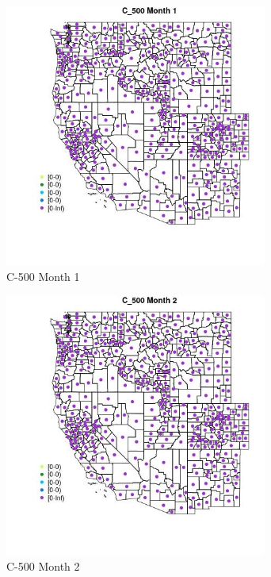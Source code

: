 \begin{figure} 
\centering  
\includegraphics[width=0.77\textwidth]{Code_Outputs/df_report_ML_predictors_CountyCentroid_Locations_Dates_2008-01-01to2018-12-31_MapObsMo1C_500.jpg} 
\caption{\label{fig:df_report_ML_predictors_CountyCentroid_Locations_Dates_2008-01-01to2018-12-31MapObsMo1C_500}C-500 Month 1} 
\end{figure} 
 

\begin{figure} 
\centering  
\includegraphics[width=0.77\textwidth]{Code_Outputs/df_report_ML_predictors_CountyCentroid_Locations_Dates_2008-01-01to2018-12-31_MapObsMo2C_500.jpg} 
\caption{\label{fig:df_report_ML_predictors_CountyCentroid_Locations_Dates_2008-01-01to2018-12-31MapObsMo2C_500}C-500 Month 2} 
\end{figure} 
 

